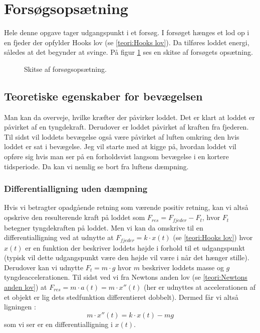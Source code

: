 \section{Forsøgsopsætning}
Hele denne opgave tager udgangspunkt i et forsøg.
I forsøget hænges et lod op i en fjeder der opfylder Hooks lov (se \ref{teori:Hooks lov}). 
Da tilføres loddet energi, således at det begynder at svinge. 
På figur \ref{fig:Basis Forsogsopsaetning} ses en skitse af forsøgets opsætning.

\begin{figure}[h]
\center
{}%

\caption{Skitse af forsøgsopsætning.}
\label{fig:Basis Forsogsopsaetning}
\end{figure} 

\subsection{Teoretiske egenskaber for bevægelsen}
Man kan da overveje, hvilke kræfter der påvirker loddet. 
Det er klart at loddet er påvirket af en tyngdekraft. 
Derudover er loddet påvirket af kraften fra fjederen.
Til sidst vil loddets bevægelse også være påvirket af luften omkring den hvis loddet er sat i bevægelse. 
Jeg vil starte med at kigge på, hvordan loddet vil opføre sig hvis man ser på en forholdsvist langsom bevægelse i en kortere tidsperiode.
Da kan vi nemlig se bort fra luftens dæmpning. 

\subsubsection{Differentialligning uden dæmpning}\label{teori: Opstilling ligning uden dampning}
Hvis vi betragter opadgående retning som værende positiv retning, kan vi altså opskrive den resulterende kraft på loddet som $F_{res} = F_{fjeder}-F_{t}$, hvor $F_t$ betegner tyngdekraften på loddet. 
Men vi kan da omskrive til en differentialligning ved at udnytte at $F_{fjeder}=k \cdot x(t)$ (se \ref{teori:Hooks lov}) hvor $x(t)$ er en funktion der beskriver loddets højde i forhold til et udgangspunkt (typisk vil dette udgangspunkt være den højde vil være i når det hænger stille). 
Derudover kan vi udnytte $F_{t}=m\cdot g$ hvor $m$ beskriver loddets masse og $g$ tyngdeaccelerationen. 
Til sidst ved vi fra Newtons anden lov (se \ref{teori:Newtons anden lov}) at $F_{res}=m\cdot a(t) = m \cdot x''(t)$ 
(her er udnyttes at accelerationen af et objekt er lig dets stedfunktion differentieret dobbelt). 
Dermed får vi altså ligningen :
$$m\cdot x''(t)=k\cdot x(t)-mg$$ 
som vi ser er en differentialligning i $x(t)$.

